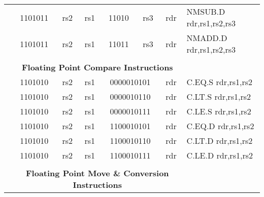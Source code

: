 \begin{table}[p]
\begin{small}
\begin{center}
\begin{tabular}{rcccccccccl}
&
\multicolumn{2}{|c|}{1101011} &
\multicolumn{1}{c|}{rs2} &
\multicolumn{1}{c|}{rs1} &
\multicolumn{2}{c|}{11010} &
\multicolumn{2}{c|}{rs3} &
\multicolumn{1}{c|}{rdr} & NMSUB.D rdr,rs1,rs2,rs3 \\
\cline{2-10}
  

&
\multicolumn{2}{|c|}{1101011} &
\multicolumn{1}{c|}{rs2} &
\multicolumn{1}{c|}{rs1} &
\multicolumn{2}{c|}{11011} &
\multicolumn{2}{c|}{rs3} &
\multicolumn{1}{c|}{rdr} & NMADD.D rdr,rs1,rs2,rs3 \\
\cline{2-10}
  

&
\multicolumn{9}{c}{} & \\
&
\multicolumn{9}{c}{\bf Floating Point Compare Instructions} & \\
\cline{2-10}
  

&
\multicolumn{2}{|c|}{1101010} &
\multicolumn{1}{c|}{rs2} &
\multicolumn{1}{c|}{rs1} &
\multicolumn{4}{c|}{0000010101} &
\multicolumn{1}{c|}{rdr} & C.EQ.S rdr,rs1,rs2 \\
\cline{2-10}
  

&
\multicolumn{2}{|c|}{1101010} &
\multicolumn{1}{c|}{rs2} &
\multicolumn{1}{c|}{rs1} &
\multicolumn{4}{c|}{0000010110} &
\multicolumn{1}{c|}{rdr} & C.LT.S rdr,rs1,rs2 \\
\cline{2-10}
  

&
\multicolumn{2}{|c|}{1101010} &
\multicolumn{1}{c|}{rs2} &
\multicolumn{1}{c|}{rs1} &
\multicolumn{4}{c|}{0000010111} &
\multicolumn{1}{c|}{rdr} & C.LE.S rdr,rs1,rs2 \\
\cline{2-10}
  

&
\multicolumn{2}{|c|}{1101010} &
\multicolumn{1}{c|}{rs2} &
\multicolumn{1}{c|}{rs1} &
\multicolumn{4}{c|}{1100010101} &
\multicolumn{1}{c|}{rdr} & C.EQ.D rdr,rs1,rs2 \\
\cline{2-10}
  

&
\multicolumn{2}{|c|}{1101010} &
\multicolumn{1}{c|}{rs2} &
\multicolumn{1}{c|}{rs1} &
\multicolumn{4}{c|}{1100010110} &
\multicolumn{1}{c|}{rdr} & C.LT.D rdr,rs1,rs2 \\
\cline{2-10}
  

&
\multicolumn{2}{|c|}{1101010} &
\multicolumn{1}{c|}{rs2} &
\multicolumn{1}{c|}{rs1} &
\multicolumn{4}{c|}{1100010111} &
\multicolumn{1}{c|}{rdr} & C.LE.D rdr,rs1,rs2 \\
\cline{2-10}
  

&
\multicolumn{9}{c}{} & \\
&
\multicolumn{9}{c}{\bf Floating Point Move \& Conversion Instructions} & \\
\cline{2-10}
  


\end{tabular}
\end{center}
\end{small}
\end{table}
